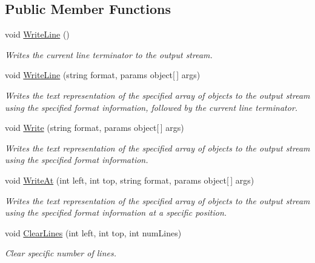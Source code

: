\subsection*{Public Member Functions}
\begin{DoxyCompactItemize}
\item 
void \hyperlink{interface_minesweeper_1_1_lib_1_1_i_renderer_a150b8784f5e36e60321bde94eee5547d}{Write\+Line} ()
\begin{DoxyCompactList}\small\item\em Writes the current line terminator to the output stream. \end{DoxyCompactList}\item 
void \hyperlink{interface_minesweeper_1_1_lib_1_1_i_renderer_a70b1435fe82e94c6b97367b374b70d05}{Write\+Line} (string format, params object\mbox{[}$\,$\mbox{]} args)
\begin{DoxyCompactList}\small\item\em Writes the text representation of the specified array of objects to the output stream using the specified format information, followed by the current line terminator. \end{DoxyCompactList}\item 
void \hyperlink{interface_minesweeper_1_1_lib_1_1_i_renderer_a05ea2257710476341378ee29f6f7762b}{Write} (string format, params object\mbox{[}$\,$\mbox{]} args)
\begin{DoxyCompactList}\small\item\em Writes the text representation of the specified array of objects to the output stream using the specified format information. \end{DoxyCompactList}\item 
void \hyperlink{interface_minesweeper_1_1_lib_1_1_i_renderer_a1f08c5c282e4ce3d59f0e6734c90bdf7}{Write\+At} (int left, int top, string format, params object\mbox{[}$\,$\mbox{]} args)
\begin{DoxyCompactList}\small\item\em Writes the text representation of the specified array of objects to the output stream using the specified format information at a specific position. \end{DoxyCompactList}\item 
void \hyperlink{interface_minesweeper_1_1_lib_1_1_i_renderer_ab9daae4f93263816808f642cba7e9875}{Clear\+Lines} (int left, int top, int num\+Lines)
\begin{DoxyCompactList}\small\item\em Clear specific number of lines. \end{DoxyCompactList}\end{DoxyCompactItemize}


